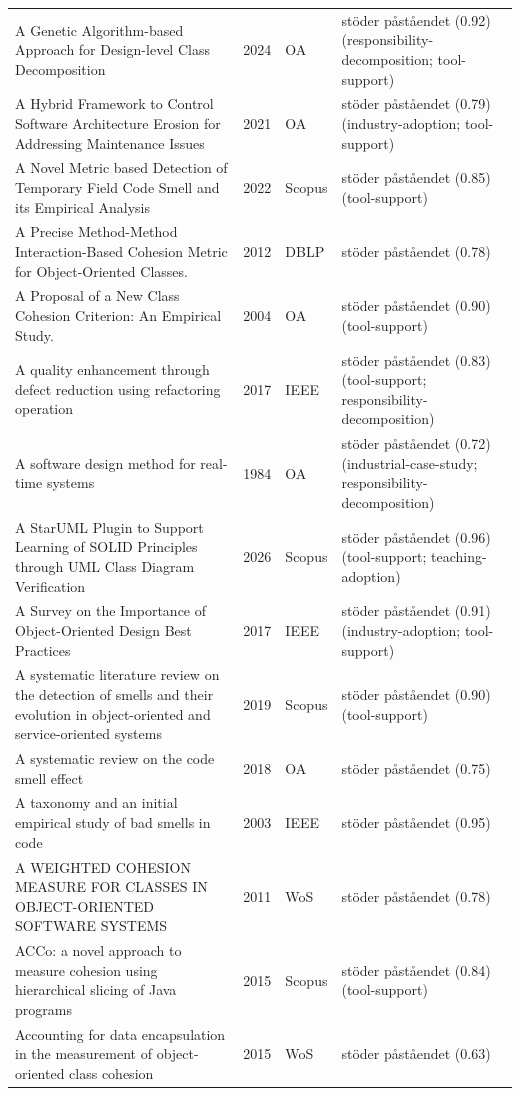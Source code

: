 \begin{longtable}{@{}%
  >{\raggedright\arraybackslash}p{}c%
  >{\raggedright\arraybackslash}p{}%
  >{\raggedright\arraybackslash}p{}@{}}
A Genetic Algorithm-based Approach for Design-level Class Decomposition & 2024 & OA & stöder påståendet (0.92) (responsibility-decomposition; tool-support) \\
A Hybrid Framework to Control Software Architecture Erosion for Addressing Maintenance Issues & 2021 & OA & stöder påståendet (0.79) (industry-adoption; tool-support) \\
A Novel Metric based Detection of Temporary Field Code Smell and its Empirical Analysis & 2022 & Scopus & stöder påståendet (0.85) (tool-support) \\
A Precise Method-Method Interaction-Based Cohesion Metric for Object-Oriented Classes. & 2012 & DBLP & stöder påståendet (0.78) \\
A Proposal of a New Class Cohesion Criterion: An Empirical Study. & 2004 & OA & stöder påståendet (0.90) (tool-support) \\
A quality enhancement through defect reduction using refactoring operation & 2017 & IEEE & stöder påståendet (0.83) (tool-support; responsibility-decomposition) \\
A software design method for real-time systems & 1984 & OA & stöder påståendet (0.72) (industrial-case-study; responsibility-decomposition) \\
A StarUML Plugin to Support Learning of SOLID Principles through UML Class Diagram Verification & 2026 & Scopus & stöder påståendet (0.96) (tool-support; teaching-adoption) \\
A Survey on the Importance of Object-Oriented Design Best Practices & 2017 & IEEE & stöder påståendet (0.91) (industry-adoption; tool-support) \\
A systematic literature review on the detection of smells and their evolution in object-oriented and service-oriented systems & 2019 & Scopus & stöder påståendet (0.90) (tool-support) \\
A systematic review on the code smell effect & 2018 & OA & stöder påståendet (0.75) \\
A taxonomy and an initial empirical study of bad smells in code & 2003 & IEEE & stöder påståendet (0.95) \\
A WEIGHTED COHESION MEASURE FOR CLASSES IN OBJECT-ORIENTED SOFTWARE SYSTEMS & 2011 & WoS & stöder påståendet (0.78) \\
ACCo: a novel approach to measure cohesion using hierarchical slicing of Java programs & 2015 & Scopus & stöder påståendet (0.84) (tool-support) \\
Accounting for data encapsulation in the measurement of object-oriented class cohesion & 2015 & WoS & stöder påståendet (0.63) \\

\end{longtable}
